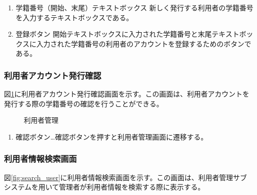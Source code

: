 \documentclass[a4j]{jarticle}
\begin{document}
\begin{enumerate}
  \renewcommand{\labelenumi}{\textcircled{\scriptsize \theenumi}}

\item 学籍番号（開始、末尾）テキストボックス
  新しく発行する利用者の学籍番号を入力するテキストボックスである。
\item 登録ボタン
  開始テキストボックスに入力された学籍番号と末尾テキストボックスに入力された学籍番号の利用者のアカウントを登録するためのボタンである。
\end{enumerate}

\subsubsection{利用者アカウント発行確認}
図\ref{fig:new_user}に利用者アカウント発行確認画面を示す。この画面は、利用者アカウントを発行する際の学籍番号の確認を行うことができる。
\begin{figure}[H]
\centering
{}
\caption{利用者管理}
\label{fig:new_user}
\end{figure}

\begin{enumerate}
  \renewcommand{\labelenumi}{\textcircled{\scriptsize \theenumi}}

\item 確認ボタン…確認ボタンを押すと利用者管理画面に遷移する。

\end{enumerate}

\subsubsection{利用者情報検索画面}
図\ref{fig:search_user}に利用者情報検索画面を示す。この画面は、利用者管理サブシステムを用いて管理者が利用者情報を検索する際に表示する。
\end{document}
